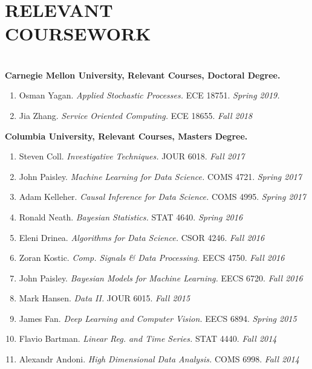 \documentclass[margin]{res}
\newcommand{\fullhrulefill}{%
	\vspace{.7\baselineskip}
	\hspace*{-\sectionwidth}\hrulefill%
}
\begin{document}
\begin{resume}
\section{RELEVANT\\COURSEWORK}
\vspace{\baselineskip}
\fullhrulefill
\section{}
\textbf{Carnegie Mellon University, Relevant Courses, Doctoral Degree.}
\begin{enumerate}
	\item Osman Yagan. \textit{Applied Stochastic Processes.} ECE 18751. \hfill \textit{Spring 2019.}
	\item Jia Zhang.\textit{ Service Oriented Computing.} ECE 18655. \hfill \textit{Fall 2018}
\end{enumerate}
\textbf{Columbia University, Relevant Courses, Masters Degree.}
\begin{enumerate}
	\item Steven Coll. \textit{Investigative Techniques.} JOUR 6018. \hfill \textit{Fall 2017}
	\item John Paisley. \textit{Machine Learning for Data Science.} COMS 4721. \hfill \textit{Spring 2017}
	\item Adam Kelleher.\textit{ Causal Inference for Data Science.} COMS 4995. \hfill \textit{Spring 2017}
	\item Ronald Neath. \textit{Bayesian Statistics.} STAT 4640. \hfill \textit{Spring 2016}
	\item Eleni Drinea.\textit{ Algorithms for Data Science.} CSOR 4246. \hfill \textit{Fall 2016}
	\item Zoran Kostic. \textit{Comp. Signals \& Data Processing.} EECS 4750. \hfill \textit{Fall 2016}
	\item John Paisley.\textit{ Bayesian Models for Machine Learning.} EECS 6720. \hfill \textit{Fall 2016}
	\item Mark Hansen.\textit{ Data II.} JOUR 6015. \hfill \textit{Fall 2015} 
	\item James Fan. \textit{Deep Learning and Computer Vision.} EECS 6894. \hfill \textit{Spring 2015}
	\item Flavio Bartman. \textit{Linear Reg. and Time Series.} STAT 4440. \hfill \textit{Fall 2014}
	\item Alexandr Andoni. \textit{High Dimensional Data Analysis.} COMS 6998. \hfill \textit{Fall 2014}

\end{enumerate}
\end{resume}
\end{document}
